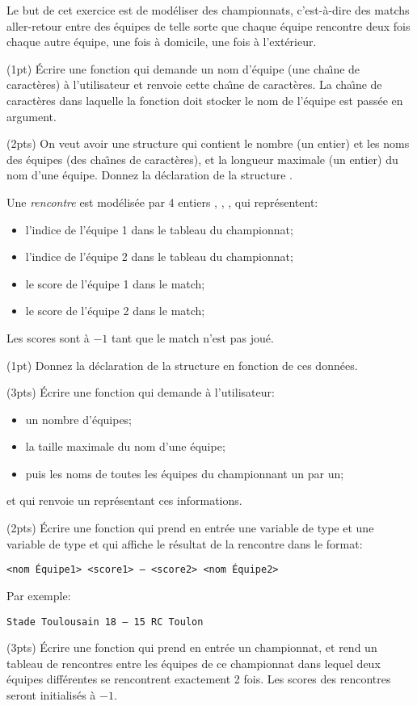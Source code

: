 
Le but de cet exercice est de mod{\'e}liser des championnats, c'est-{\`a}-dire
des matchs aller-retour entre des {\'e}quipes de telle sorte que chaque
{\'e}quipe rencontre deux fois chaque autre {\'e}quipe, une fois {\`a} domicile,
une fois {\`a} l'ext{\'e}rieur.


\question (1pt) {\'E}crire une fonction qui demande un nom d'{\'e}quipe (une
cha{\^\i}ne de caract{\`e}res) {\`a} l'utilisateur et renvoie cette cha{\^\i}ne de
caract{\`e}res. La cha{\^\i}ne de caract{\`e}res dans laquelle la fonction doit
stocker le nom de l'{\'e}quipe est pass{\'e}e en argument.

\question (2pts) On veut avoir une structure  qui
contient le nombre (un entier) et les noms des {\'e}quipes (des cha{\^\i}nes de
caract{\`e}res), et la longueur maximale (un entier) du nom d'une
{\'e}quipe. Donnez la d{\'e}claration de la structure .

Une \emph{rencontre} est mod{\'e}lis{\'e}e par 4 entiers ,
, ,  qui repr{\'e}sentent:
\begin{itemize}
\item l'indice de l'{\'e}quipe 1 dans le tableau du championnat;
\item l'indice de l'{\'e}quipe 2 dans le tableau du championnat;
\item le score de l'{\'e}quipe 1 dans le match;
\item le score de l'{\'e}quipe 2 dans le match;
\end{itemize}
Les scores sont {\`a} $-1$ tant que le match n'est pas jou{\'e}.

\question (1pt) Donnez la d{\'e}claration de la structure
 en fonction de ces donn{\'e}es.

\question (3pts) {\'E}crire une fonction qui demande {\`a} l'utilisateur:
\begin{itemize}
\item un nombre d'{\'e}quipes;
\item la taille maximale du nom d'une {\'e}quipe;
\item puis les noms de toutes les {\'e}quipes du championnant un par un;
\end{itemize}
et qui renvoie un  repr{\'e}sentant ces informations.

\question (2pts) {\'E}crire une fonction qui prend en entr{\'e}e une variable
de type  et une variable de type  et
qui affiche le r{\'e}sultat de la rencontre dans le format:
\begin{center}
  \texttt{<nom \'Equipe1> <score1> -- <score2> <nom \'Equipe2>}
\end{center}
Par exemple:
\begin{center}
  \texttt{Stade Toulousain 18 -- 15 RC Toulon}
\end{center}

\question (3pts) {\'E}crire une fonction qui prend en entr{\'e}e un
championnat, et rend un tableau de rencontres entre les {\'e}quipes de ce
championnat dans lequel deux {\'e}quipes diff{\'e}rentes se rencontrent
exactement 2 fois. Les scores des rencontres seront initialis{\'e}s {\`a} $-1$.

